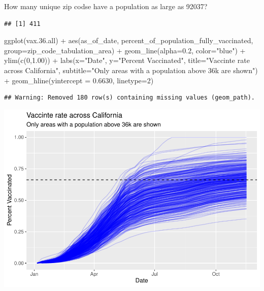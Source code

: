 \documentclass[
]{article}
\newenvironment{Shaded}{\begin{snugshade}}{\end{snugshade}}
\newcommand{\AttributeTok}[1]{\textcolor[rgb]{0.77,0.63,0.00}{#1}}
\newcommand{\DecValTok}[1]{\textcolor[rgb]{0.00,0.00,0.81}{#1}}
\newcommand{\FloatTok}[1]{\textcolor[rgb]{0.00,0.00,0.81}{#1}}
\newcommand{\FunctionTok}[1]{\textcolor[rgb]{0.00,0.00,0.00}{#1}}
\newcommand{\NormalTok}[1]{#1}
\newcommand{\SpecialCharTok}[1]{\textcolor[rgb]{0.00,0.00,0.00}{#1}}
\newcommand{\StringTok}[1]{\textcolor[rgb]{0.31,0.60,0.02}{#1}}
\begin{document}
How many unique zip codse have a population as large as 92037?

\begin{Shaded}
\end{Shaded}

\begin{verbatim}
## [1] 411
\end{verbatim}

\begin{Shaded}
\begin{Highlighting}[]
\FunctionTok{ggplot}\NormalTok{(vax.}\FloatTok{36.}\NormalTok{all) }\SpecialCharTok{+}
  \FunctionTok{aes}\NormalTok{(as\_of\_date,}
\NormalTok{      percent\_of\_population\_fully\_vaccinated, }
      \AttributeTok{group=}\NormalTok{zip\_code\_tabulation\_area) }\SpecialCharTok{+}
  \FunctionTok{geom\_line}\NormalTok{(}\AttributeTok{alpha=}\FloatTok{0.2}\NormalTok{, }\AttributeTok{color=}\StringTok{"blue"}\NormalTok{) }\SpecialCharTok{+}
  \FunctionTok{ylim}\NormalTok{(}\FunctionTok{c}\NormalTok{(}\DecValTok{0}\NormalTok{,}\FloatTok{1.00}\NormalTok{)) }\SpecialCharTok{+}
  \FunctionTok{labs}\NormalTok{(}\AttributeTok{x=}\StringTok{"Date"}\NormalTok{, }\AttributeTok{y=}\StringTok{"Percent Vaccinated"}\NormalTok{,}
       \AttributeTok{title=}\StringTok{"Vaccinte rate across California"}\NormalTok{,}
       \AttributeTok{subtitle=}\StringTok{"Only areas with a population above 36k are shown"}\NormalTok{) }\SpecialCharTok{+}
  \FunctionTok{geom\_hline}\NormalTok{(}\AttributeTok{yintercept =} \FloatTok{0.6630}\NormalTok{, }\AttributeTok{linetype=}\DecValTok{2}\NormalTok{)}
\end{Highlighting}
\end{Shaded}

\begin{verbatim}
## Warning: Removed 180 row(s) containing missing values (geom_path).
\end{verbatim}

\includegraphics{Vaccine-rate-mini-project_files/figure-latex/unnamed-chunk-40-1.pdf}
\end{document}
